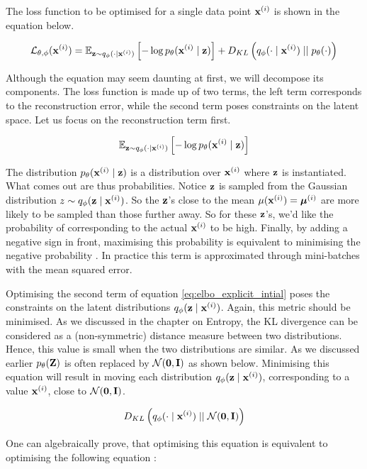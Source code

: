 The loss function to be optimised for a single data point $\mathbf{x}^{(i)}$ is shown in the equation below.

\begin{equation}
	\mathcal{L}_{\theta, \phi} (\mathbf{x}^{(i)}) = \mathbb{E}_{\mathbf{z} \sim q_\phi (\cdot \mid \mathbf{x}^{(i)})} \left[ -\log p_\theta (\mathbf{x}^{(i)} \mid \mathbf{z}) \right] + D_{KL} \left(  q_\phi (\cdot \mid \mathbf{x}^{(i)})  \mid \mid  p_\theta(\cdot)  \right) \label{eq:elbo_explicit_intial}
\end{equation} %

Although the equation may seem daunting at first, we will decompose its components. The loss function is made up of two terms, the left term corresponds to the reconstruction error, while the second term poses constraints on the latent space. Let us focus on the reconstruction term first.

$$
\mathbb{E}_{\mathbf{z} \sim q_\phi (\cdot \mid \mathbf{x}^{(i)})} \left[ -\log p_\theta (\mathbf{x}^{(i)} \mid \mathbf{z}) \right]
$$

The distribution $p_\theta (\mathbf{x}^{(i)} \mid \mathbf{z})$ is a distribution over $\mathbf{x}^{(i)}$ where $\mathbf{z}$ is instantiated. What comes out are thus probabilities. Notice $\mathbf{z}$ is sampled from the Gaussian distribution $z \sim q_\phi (\mathbf{z} \mid \mathbf{x}^{(i)})$. So the $\mathbf{z}$'s close to the mean $\mu(\mathbf{x}^{(i)}) = \bm{\mu}^{(i)}$ are more likely to be sampled than those further away. So for these $\mathbf{z}$'s, we'd like the probability of corresponding to the actual $\mathbf{x}^{(i)}$ to be high. Finally, by adding a negative sign in front, maximising this probability is equivalent to minimising the negative probability \cite{pinheirocinelliVariationalAutoencoder2021}. %
In practice this term is approximated through mini-batches with the mean squared error. %


Optimising the second term of equation \ref{eq:elbo_explicit_intial} poses the constraints on the latent distributions $q_\phi (\mathbf{z} \mid \mathbf{x}^{(i)})$. Again, this metric should be minimised. As we discussed in the chapter on Entropy, the KL divergence can be considered as a (non-symmetric) distance measure between two distributions. Hence, this value is small when the two distributions are similar. As we discussed earlier $p_\theta(\mathbf{Z})$ is often replaced by $\mathcal{N}(\bm{\mathbf{0}}, \mathbf{I})$ as shown below. Minimising this equation will result in moving each distribution $q_\phi (\mathbf{z} \mid \mathbf{x}^{(i)})$, corresponding to a value $\mathbf{x}^{(i)}$, close to $\mathcal{N}(\bm{\mathbf{0}}, \mathbf{I})$.

$$
D_{KL} \left(  q_\phi (\cdot \mid \mathbf{x}^{(i)})  \mid \mid  \mathcal{N}(\bm{\mathbf{0}}, \mathbf{I})  \right)
$$

One can algebraically prove, that optimising this equation is equivalent to optimising the following equation \cite{kingmaAutoEncodingVariationalBayes2022}: 


